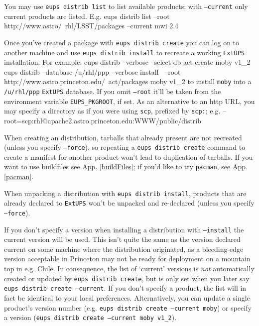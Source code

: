 \documentclass{article}
\newcommand{\code}[1]{\texttt{#1}}
\newcommand{\file}[1]{\texttt{#1}}
\newcommand{\eups}{\code{ExtUPS}\xspace}
\newcommand{\pacman}{\code{pacman}}
\let\overbatim=\verbatim
\let\oendverbatim=\endverbatim
\renewenvironment{verbatim}
{\center\minipage{16cm}\overbatim}
{\oendverbatim\endminipage\endcenter}
\begin{document}
You may use \code{eups distrib list} to list available products; with \code{--current}
only current products are listed.  E.g.
\begin{verbatim}
eups distrib list --root http://www.astro/~rhl/LSST/packages --current mwi 2.4
\end{verbatim}

Once you've created a package with \code{eups distrib create} you can log on to
another machine and use \code{eups distrib install} to
recreate a working \eups installation.  For example:
\begin{verbatim}
eups distrib --verbose --select-db act create moby v1_2
eups distrib --database /u/rhl/ppp --verbose install \
             --root http://www.astro.princeton.edu/~act/packages moby v1_2
\end{verbatim}
to install \code{moby} into a \file{/u/rhl/ppp} \eups database. If you omit
\code{--root} it'll be taken from the environment variable \code{EUPS\_PKGROOT},
if set.  As an alternative to an http URL, you may specify a directory as
if you were using \code{scp}, prefixed by \code{scp:}; e.g.
\begin{verbatim}
    --root=scp:rhl@apache2.astro.princeton.edu:WWW/public/distrib
\end{verbatim}

When creating an distribution, tarballs that already present are not recreated
(unless you specify \code{--force}),
so repeating a \code{eups distrib create} command to create a manifest for another
product won't lead to duplication of tarballs.  If you want to use buildfiles
see App. \ref{buildFiles}; if you'd like to try \pacman{}, see App. \ref{pacman}.

When unpacking a distribution with \code{eups distrib install}, products that are
already declared to \eups won't be unpacked and re-declared (unless you specify \code{--force}).

If you don't specify a version when installing a distribution with
\code{--install} the current version will be used.  This isn't quite the same
as the version declared current on some machine where the distribution
originated, as a bleeding-edge version acceptable in Princeton may not
be ready for deployment on a mountain top in e.g. Chile. In
consequence, the list of `current' versions is \textit{not}
automatically created or updated by \code{eups distrib create}, but is
only set when you later say \code{eups distrib create --current}.  If you don't specify
a product, the list will in fact be identical to your local preferences.
Alternatively, you can update a single product's version number (e.g.
\code{eups distrib create --current moby}) or specify a version (\code{eups distrib create --current moby v1\_2}).
\end{document}
